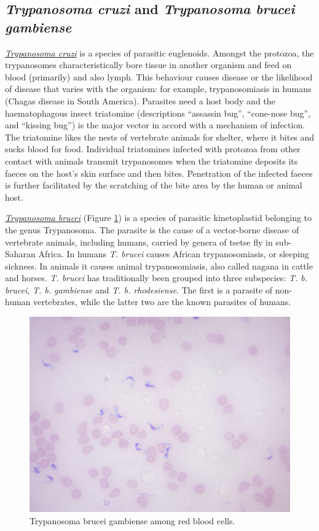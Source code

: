 \subsection{\texorpdfstring{\emph{Trypanosoma cruzi} and
\emph{Trypanosoma brucei
gambiense}}{Trypanosoma cruzi and Trypanosoma brucei gambiense}}\label{trypanosoma-cruzi-and-trypanosoma-brucei-gambiense}

\href{https://en.wikipedia.org/wiki/Trypanosoma_cruzi}{\emph{Trypanosoma
cruzi}} is a species of parasitic euglenoids. Amongst the protozoa, the
trypanosomes characteristically bore tissue in another organism and feed
on blood (primarily) and also lymph. This behaviour causes disease or
the likelihood of disease that varies with the organism: for example,
trypanosomiasis in humans (Chagas disease in South America). Parasites
need a host body and the haematophagous insect triatomine (descriptions
``assassin bug'', ``cone-nose bug'', and ``kissing bug'') is the major
vector in accord with a mechanism of infection. The triatomine likes the
nests of vertebrate animals for shelter, where it bites and sucks blood
for food. Individual triatomines infected with protozoa from other
contact with animals transmit trypanosomes when the triatomine deposits
its faeces on the host's skin surface and then bites. Penetration of the
infected faeces is further facilitated by the scratching of the bite
area by the human or animal host.

\href{https://en.wikipedia.org/wiki/Trypanosoma_brucei}{\emph{Trypanosoma
brucei}} (Figure \ref{fig:gambiense}) is a species of parasitic
kinetoplastid belonging to the genus Trypanosoma. The parasite is the
cause of a vector-borne disease of vertebrate animals, including humans,
carried by genera of tsetse fly in sub-Saharan Africa. In humans
\emph{T. brucei} causes African trypanosomiasis, or sleeping sickness.
In animals it causes animal trypanosomiasis, also called nagana in
cattle and horses. \emph{T. brucei} has traditionally been grouped into
three subspecies: \emph{T. b. brucei}, \emph{T. b. gambiense} and
\emph{T. b. rhodesiense}. The first is a parasite of non-human
vertebrates, while the latter two are the known parasites of humans.

\begin{figure}

{\centering \includegraphics[width=0.7\linewidth]{./figures/protists/gambiense} 

}

\caption{Trypanosoma brucei gambiense among red blood cells.}\label{fig:gambiense}
\end{figure}

